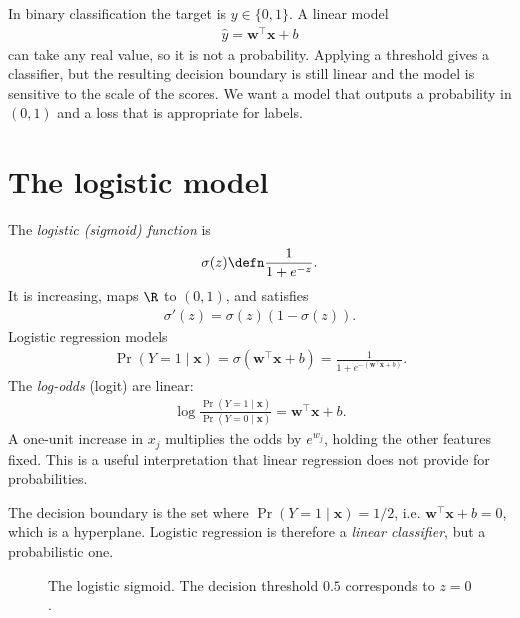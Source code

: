 \documentclass[a4paper, 12pt]{book}
\begin{document}
In binary classification the target is $y \in \{0,1\}$. A linear model
\begin{align}
    \hat{y} = \mathbf{w}^\top\mathbf{x} + b
\end{align}
can take any real value, so it is not a
probability. Applying a threshold gives a classifier, but the resulting decision
boundary is still linear and the model is sensitive to the scale of the scores. We
want a model that outputs a probability in $(0,1)$ and a loss that is appropriate for
labels.

\section{The logistic model}

The \emph{logistic (sigmoid) function} is
\begin{align}
    \sigma(z) \defn \frac{1}{1+e^{-z}}.
\end{align}
It is increasing, maps $\R$ to $(0,1)$, and satisfies
\begin{align}
    \sigma'(z)=\sigma(z)(1-\sigma(z)).
\end{align}
Logistic regression models
\begin{align}
    \Pr(Y=1\mid\mathbf{x}) = \sigma(\mathbf{w}^\top\mathbf{x} + b)
    = \frac{1}{1+e^{-(\mathbf{w}^\top\mathbf{x}+b)}}.
\end{align}
The \emph{log-odds} (logit) are linear:
\begin{align}
    \log\frac{\Pr(Y=1\mid\mathbf{x})}{\Pr(Y=0\mid\mathbf{x})}
    = \mathbf{w}^\top\mathbf{x} + b.
\end{align}
A one-unit increase in $x_j$ multiplies the odds by $e^{w_j}$, holding the other
features fixed. This is a useful interpretation that linear regression does not
provide for probabilities.

The decision boundary is the set where $\Pr(Y=1\mid\mathbf{x})=1/2$, i.e.
$\mathbf{w}^\top\mathbf{x}+b=0$, which is a hyperplane. Logistic regression is
therefore a \emph{linear classifier}, but a probabilistic one.

\begin{figure}[htbp]
\centering
{}
\caption{The logistic sigmoid. The decision threshold $0.5$ corresponds to $z=0$.}
\label{fig:sigmoid}
\end{figure}
\end{document}
